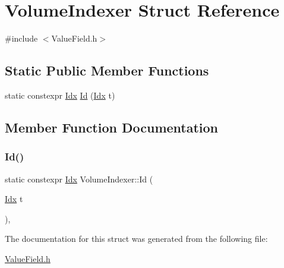 \hypertarget{structVolumeIndexer}{}\section{Volume\+Indexer Struct Reference}
\label{structVolumeIndexer}


{\ttfamily \#include $<$Value\+Field.\+h$>$}

\subsection*{Static Public Member Functions}
\begin{DoxyCompactItemize}
\item 
static constexpr \hyperlink{Includes_8h_ae78891cd308078a2f5f9e7193065c805}{Idx} \hyperlink{structVolumeIndexer_a97bac6462b6aa4519e73b728ee00c0e2}{Id} (\hyperlink{Includes_8h_ae78891cd308078a2f5f9e7193065c805}{Idx} t)
\end{DoxyCompactItemize}


\subsection{Member Function Documentation}
\mbox{\label{structVolumeIndexer_a97bac6462b6aa4519e73b728ee00c0e2}} 
\subsubsection{\texorpdfstring{Id()}{Id()}}
{\footnotesize\ttfamily static constexpr \hyperlink{Includes_8h_ae78891cd308078a2f5f9e7193065c805}{Idx} Volume\+Indexer\+::\+Id (\begin{DoxyParamCaption}\item[{\hyperlink{Includes_8h_ae78891cd308078a2f5f9e7193065c805}{Idx}}]{t }\end{DoxyParamCaption})\hspace{0.3cm}{\ttfamily [inline]}, {\ttfamily [static]}}



The documentation for this struct was generated from the following file\+:\begin{DoxyCompactItemize}
\item 
\hyperlink{ValueField_8h}{Value\+Field.\+h}\end{DoxyCompactItemize}

